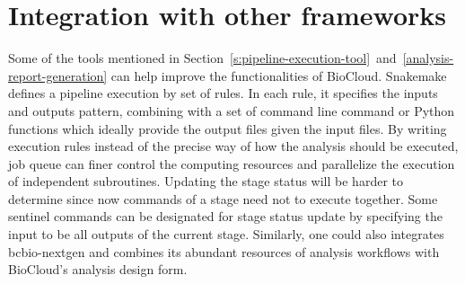 \section{Integration with other frameworks}

Some of the tools mentioned in
Section~\ref{s:pipeline-execution-tool}~and~\ref{analysis-report-generation}
can help improve the functionalities of BioCloud. Snakemake
\cite{koster2012:snakemakea} defines a pipeline execution by set of rules. In
each rule, it specifies the inputs and outputs pattern, combining with a set of
command line command or Python functions which ideally provide the output files
given the input files. By writing execution rules instead of the precise way of
how the analysis should be executed, job queue can finer control the computing
resources and parallelize the execution of independent subroutines. Updating
the stage status will be harder to determine since now commands of a stage need
not to execute together. Some sentinel commands can be designated for stage
status update by specifying the input to be all outputs of the current stage.
Similarly, one could also integrates bcbio-nextgen
\cite{:bcbionextgen,guimera2012:bcbionextgen} and combines its abundant
resources of analysis workflows with BioCloud's analysis design form.





